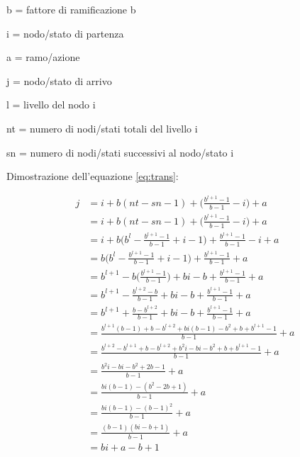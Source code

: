 \documentclass[conference]{IEEEtran}
\begin{document}
\appendix
\label{appendix:sviluppo}

b = fattore di ramificazione b

i = nodo/stato di partenza

a = ramo/azione

j = nodo/stato di arrivo

l = livello del nodo i

nt = numero di nodi/stati totali del livello i

sn = numero di nodi/stati successivi al nodo/stato i

Dimostrazione dell'equazione \ref{eq:trans}:

\begin{equation}
\begin{split}
j   & = i + b(nt - sn - 1) + \bigg(\frac{b^{l + 1} - 1}{b - 1} - i\bigg) + a\\
    & = i + b(nt - sn - 1) + \bigg(\frac{b^{l + 1} - 1}{b - 1} - i\bigg) + a\\
    & = i + b\bigg(b^{l} - \frac{b^{l + 1} - 1}{b - 1} + i - 1\bigg) + \frac{b^{l + 1} - 1}{b - 1} - i + a\\
    & = b\bigg(b^{l} - \frac{b^{l + 1} - 1}{b - 1} + i - 1\bigg) + \frac{b^{l + 1} - 1}{b - 1} + a\\
    & = b^{l + 1} - b\bigg(\frac{b^{l + 1} - 1}{b - 1}\bigg) + bi -b + \frac{b^{l + 1} - 1}{b - 1} + a\\
    & = b^{l + 1} - \frac{b^{l + 2} - b}{b - 1} + bi -b + \frac{b^{l + 1} - 1}{b - 1} + a\\
    & = b^{l + 1} + \frac{b - b^{l + 2}}{b - 1} + bi -b + \frac{b^{l + 1} - 1}{b - 1} + a\\
    & = \frac{b^{l + 1}(b - 1) + b - b^{l + 2} + bi(b - 1) -b^2 + b + b^{l + 1} - 1}{b - 1} + a\\
    & = \frac{b^{l + 2} - b^{l + 1} + b - b^{l + 2} + b^2i - bi -b^2 + b + b^{l + 1} - 1}{b - 1} + a\\
    & = \frac{b^2i - bi - b^2 + 2b - 1}{b - 1} + a\\
    & = \frac{bi(b - 1) - (b^2 - 2b + 1)}{b - 1} + a\\
    & = \frac{bi(b - 1) - (b - 1)^2}{b - 1} + a\\
    & = \frac{(b -1)(bi - b + 1)}{b-1} + a\\
    & = bi + a - b + 1
\end{split}
\end{equation}
\end{document}
